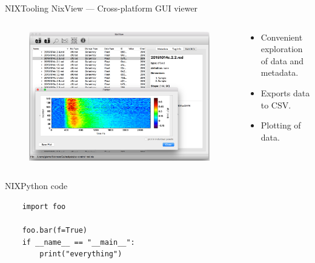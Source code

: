 \documentclass[10pt]{beamer}
\begin{document}
\begin{frame}{NIX}{Tooling}
    NixView --- Cross-platform GUI viewer

    \begin{columns}
        \begin{column}{0.5\textwidth}
            \begin{figure}
                \includegraphics[width=\textwidth]{nixview.pdf}
            \end{figure}
        \end{column}
        \begin{column}{0.5\textwidth}
            \begin{itemize}
                \item Convenient exploration of data and metadata.
                \item Exports data to CSV.\
                \item Plotting of data.
            \end{itemize}
        \end{column}
    \end{columns}
\end{frame}

\begin{frame}[fragile]{NIX}{Python code}
    \begin{verbatim}
    import foo

    foo.bar(f=True)
    if __name__ == "__main__":
        print("everything")

    \end{verbatim}

\end{frame}
\end{document}
